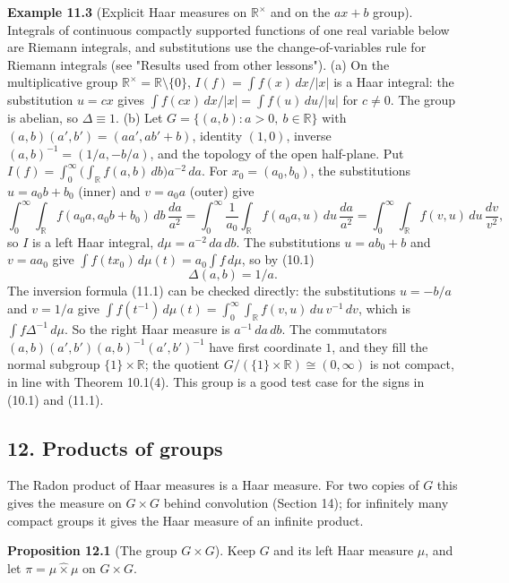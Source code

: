 \documentclass[
  english,
  11pt,
  a4paper,
]{article}
\begin{document}
\textbf{Example 11.3} (Explicit Haar measures on \(\mathbb R^\times\)
and on the \(ax+b\) group). Integrals of continuous compactly supported
functions of one real variable below are Riemann integrals, and
substitutions use the change-of-variables rule for Riemann integrals
(see "Results used from other lessons"). (a) On the multiplicative group
\(\mathbb R^\times=\mathbb R\setminus\{0\}\), \(I(f)=\int f(x)\,dx/|x|\)
is a Haar integral: the substitution \(u=cx\) gives
\(\int f(cx)\,dx/|x|=\int f(u)\,du/|u|\) for \(c\neq0\). The group is
abelian, so \(\Delta\equiv1\). (b) Let
\(G=\{(a,b):a>0,\ b\in\mathbb R\}\) with \((a,b)(a',b')=(aa',ab'+b)\),
identity \((1,0)\), inverse \((a,b)^{-1}=(1/a,-b/a)\), and the topology
of the open half-plane. Put
\(I(f)=\int_0^\infty\big(\int_{\mathbb R}f(a,b)\,db\big)a^{-2}\,da\).
For \(x_0=(a_0,b_0)\), the substitutions \(u=a_0b+b_0\) (inner) and
\(v=a_0a\) (outer) give
\[\int_0^\infty\!\!\int_{\mathbb R}f(a_0a,a_0b+b_0)\,db\,\frac{da}{a^2}=\int_0^\infty\frac1{a_0}\int_{\mathbb R}f(a_0a,u)\,du\,\frac{da}{a^2}=\int_0^\infty\!\!\int_{\mathbb R}f(v,u)\,du\,\frac{dv}{v^2},\]
so \(I\) is a left Haar integral, \(d\mu=a^{-2}\,da\,db\). The
substitutions \(u=ab_0+b\) and \(v=aa_0\) give
\(\int f(tx_0)\,d\mu(t)=a_0\int f\,d\mu\), so by (10.1)
\[\Delta(a,b)=1/a .\] The inversion formula (11.1) can be checked
directly: the substitutions \(u=-b/a\) and \(v=1/a\) give
\(\int f(t^{-1})\,d\mu(t)=\int_0^\infty\int_{\mathbb R}f(v,u)\,du\,v^{-1}\,dv\),
which is \(\int f\Delta^{-1}\,d\mu\). So the right Haar measure is
\(a^{-1}\,da\,db\). The commutators
\((a,b)(a',b')(a,b)^{-1}(a',b')^{-1}\) have first coordinate \(1\), and
they fill the normal subgroup \(\{1\}\times\mathbb R\); the quotient
\(G/(\{1\}\times\mathbb R)\cong(0,\infty)\) is not compact, in line with
Theorem 10.1(4). This group is a good test case for the signs in (10.1)
and (11.1).

\subsection{12. Products of
groups}\label{haar-measure-on-locally-compact-groups--12-products-of-groups}

The Radon product of Haar measures is a Haar measure. For two copies of
\(G\) this gives the measure on \(G\times G\) behind convolution
(Section 14); for infinitely many compact groups it gives the Haar
measure of an infinite product.

\textbf{Proposition 12.1} (The group \(G\times G\)). Keep \(G\) and its
left Haar measure \(\mu\), and let \(\pi=\mu\hat\times\mu\) on
\(G\times G\).
\end{document}
